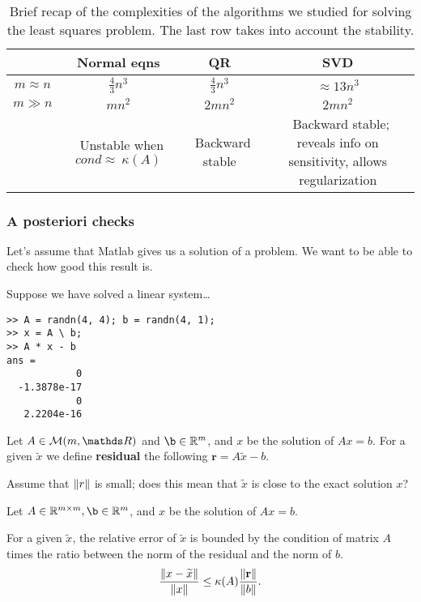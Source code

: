 \documentclass[ComputationalMathematics.tex]{subfiles}
\begin{document}
\begin{table}
\begin{center}
\begin{tabular}{cccc}
\toprule
  & \textbf{Normal eqns} & \textbf{QR} & \textbf{SVD}\\
	\midrule
$m \approx n$	& $\frac{4}{3}n^3$ & $\frac{4}{3}n^3$ & $\approx 13n^3$\\
\midrule
$m \gg n$ & $mn^2$ & $2mn^2$ & $2mn^2$\\
\midrule
& \parbox{3cm}{\raggedright~Unstable when $cond\approx~\kappa(A)$} & \parbox{2cm}{\raggedright~Backward stable} & \parbox{3cm}{\raggedright~Backward stable; reveals info on sensitivity, allows regularization}\\
\bottomrule
\end{tabular}
\end{center}\caption{Brief recap of the complexities of the algorithms we studied for solving the least squares problem. The last row takes into account the stability.}\label{tab:15nov1}
\end{table}

\subsubsection{A posteriori checks}

Let's assume that Matlab gives us a solution of a problem. We want to be able to check how good this result is.

\begin{example}
Suppose we have solved a linear system\dots

  \begin{verbatim}
>> A = randn(4, 4); b = randn(4, 1);
>> x = A \ b;
>> A * x - b
ans =
            0
  -1.3878e-17
            0
   2.2204e-16
\end{verbatim}
\end{example}

\begin{definition}[Residual]
  Let $A\in \mathcal{M}(m, {\R})$ and $\b\in\mathbb{R}^m$, and $x$ be the solution of $Ax=b$. For a given $\widetilde{x}$ we define \textbf{residual} the following $\mathbf{r}=A\widetilde{x}-b$. 
\end{definition}

Assume that $\left\lVert r\right\rVert$ is small; does this mean that $\widetilde{x}$ is close to the exact solution $x$?

\begin{theorem}
Let $A\in\mathbb{R}^{m\times m}, \b\in\mathbb{R}^m$, and $x$ be the solution of $Ax=b$.

  For a given $\widetilde{x}$, the relative error of $\widetilde{x}$ is bounded by the condition of matrix $A$ times the ratio between the norm of the residual and the norm of $b$.
\[
\frac{\left\lVert x - \widetilde{x}\right\rVert}{\left\lVert x\right\rVert} \leq \kappa(A) \frac{\left\lVert\mathbf{r}\right\rVert}{\left\lVert b\right\rVert}.	
\]
\end{theorem}
\end{document}
